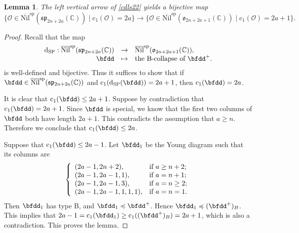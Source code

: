 \documentclass[12pt,a4paper]{amsart}
\newcommand{\BC}{{\mathbb {C}}}
\newcommand{\CO}{{\mathcal {O}}}
\newcommand{\p}{\mathfrak p}
\newcommand{\s}{\mathfrak s}
\renewcommand{\o}{\mathfrak o}
\newcommand{\be}{\begin {equation}}
\newcommand{\ee}{\end {equation}}
\numberwithin{equation}{section}
\newtheorem{lem}[thm]{Lemma}
\theoremstyle{remark}
\begin{document}
\begin{lem}\label{spspo}
The left vertical arrow of \eqref{cdls22} yields a bijective map
 \[
                      \{\CO\in \overline{\mathrm{Nil}}^{\mathrm{sp}}(\s\p_{2n+2a}(\BC))\mid \mathrm{c}_1( \CO)=2a\}\rightarrow
 \{\CO\in \overline{\mathrm{Nil}}^{\mathrm{sp}}(\o_{2n+2a+1}(\BC))\mid \mathrm{c}_1(\CO)=2a+1\}.
\]

\end{lem}
\begin{proof}
Recall that the map
\be\label{mapsp}
\begin{array}{rcl}
  \mathrm d_{\mathrm{SP}}:  \overline{\mathrm{Nil}}^{\mathrm{sp}}(\s\p_{2n+2a}(\BC))&\rightarrow &\overline{\mathrm{Nil}}^{\mathrm{sp}}(\o_{2n+2a+1}(\BC)),\\
     \bfdd & \mapsto &           \textrm{the B-collapse of $\bfdd^+$.}
     \end{array}
\ee
is well-defined and bijective. Thus it suffices to show that if $\bfdd\in \overline{\mathrm{Nil}}^{\mathrm{sp}}(\s\p_{2n+2a}(\BC))$ and $\mathrm{c}_1(\mathrm d_{\mathrm{SP}}(\bfdd))=2a+1$, then $\mathrm{c}_1(\bfdd)=2a$.

It is clear that $\mathrm c_1(\bfdd)\leq 2a+1$.
Suppose by contradiction that  $\mathrm c_1(\bfdd)= 2a+1$. Since $\bfdd$ is special, we know that the first two columns of $\bfdd$ both have length $2a+1$. This contradicts the assumption that $a\geq n$. Therefore we conclude that $\mathrm c_1(\bfdd)\leq 2a$.

 Suppose that $\mathrm c_1(\bfdd)\leq 2a-1$. Let $\bfdd_1$ be the Young diagram  such that its columns are
\[
  \left\{
    \begin{array}{ll}
      (2a-1, 2n+2), & \hbox{if $a\geq n+2$;} \\
      (2a-1,2a-1,1), & \hbox{if $a=n+1$;} \\
      (2a-1,2a-1,3), & \hbox{if $a=n\geq 2$;}\\
         (2a-1,2a-1,1,1,1), & \hbox{if $a=n=1$.}
    \end{array}
  \right.
\]
Then $\bfdd_1$ has type B, and  $\bfdd_1\preccurlyeq \bfdd^+$. Hence $\bfdd_1\preccurlyeq (\bfdd^+)_B$. This implies that $2a-1=\mathrm c_1(\bfdd_1)\geq \mathrm c_1((\bfdd^+)_B)=2a+1$, which is also a contradiction. This proves the lemma.
\end{proof}
\end{document}
